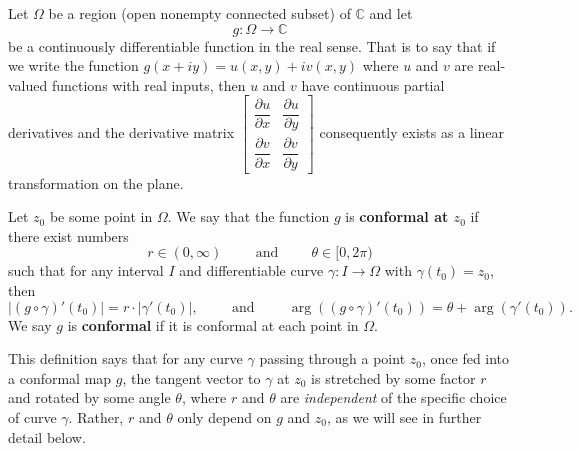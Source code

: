 \begin{definition}Let $\Omega$ be a region (open nonempty connected subset) of $\mathbb{C}$ and let $$g:\Omega\to\mathbb{C}$$ be a continuously differentiable function in the real sense. That is to say that if we write the function $g(x+iy)=u(x,y)+iv(x,y)$ where $u$ and $v$ are real-valued functions with real inputs, then $u$ and $v$ have continuous partial derivatives and the derivative matrix  $\begin{bmatrix}\dfrac{\partial u}{\partial x}&\dfrac{\partial u}{\partial y}\\\dfrac{\partial v}{\partial x}&\dfrac{\partial v}{\partial y}\end{bmatrix}$ consequently exists as a linear transformation on the plane. 

Let $z_0$ be some point in $\Omega$. We say that the function $g$ is \textbf{\textcolor{myblue}{conformal at $z_0$}} if there exist numbers $$r\in(0,\infty)\hspace{1cm}\text{and}\hspace{1cm}\theta\in[0,2\pi)$$ such that for any interval $I$ and differentiable curve $\gamma:I\to\Omega$ with $\gamma(t_0)=z_0$, then \begin{equation}
    |(g\circ\gamma)'(t_0)|=r\cdot|\gamma'(t_0)|,\hspace{1cm}\text{and}\hspace{1cm}\arg((g\circ\gamma)'(t_0))=\theta+\arg(\gamma'(t_0)).\label{conformal}
\end{equation}
We say $g$ is \textbf{\textcolor{myblue}{conformal}} if it is conformal at each point in $\Omega$. 
\end{definition}

This definition says that for any curve $\gamma$ passing through a point $z_0$, once fed into a conformal map $g$, the tangent vector to $\gamma$ at $z_0$ is stretched by some factor $r$ and rotated by some angle $\theta$, where $r$ and $\theta$ are \textit{independent} of the specific choice of curve $\gamma$. Rather, $r$ and $\theta$ only depend on $g$ and $z_0$, as we will see in further detail below.

